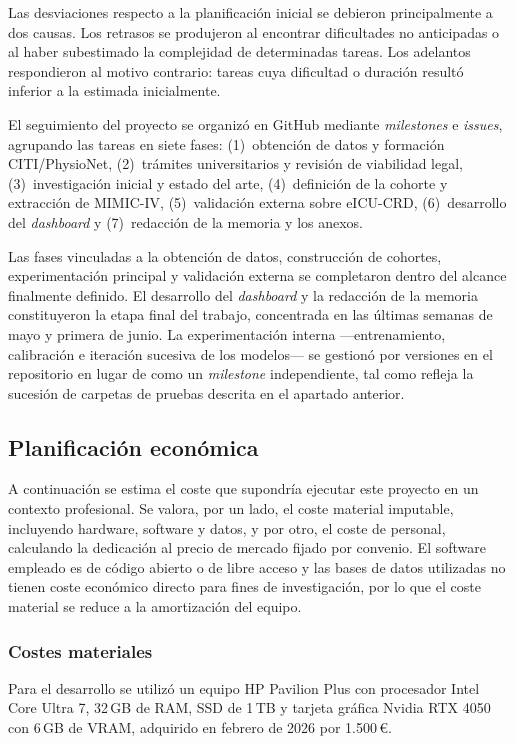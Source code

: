 \documentclass[
  spanish,
  a4paper,
  12pt,
  twoside]{memoir}
\begin{document}
Las desviaciones respecto a la planificación inicial se debieron principalmente a dos causas. Los retrasos se produjeron al encontrar dificultades no anticipadas o al haber subestimado la complejidad de determinadas tareas. Los adelantos respondieron al motivo contrario: tareas cuya dificultad o duración resultó inferior a la estimada inicialmente.

El seguimiento del proyecto se organizó en GitHub mediante \textit{milestones} e \textit{issues}, agrupando las tareas en siete fases: (1)~obtención de datos y formación CITI/PhysioNet, (2)~trámites universitarios y revisión de viabilidad legal, (3)~investigación inicial y estado del arte, (4)~definición de la cohorte y extracción de MIMIC-IV, (5)~validación externa sobre eICU-CRD, (6)~desarrollo del \textit{dashboard} y (7)~redacción de la memoria y los anexos.

Las fases vinculadas a la obtención de datos, construcción de cohortes, experimentación principal y validación externa se completaron dentro del alcance finalmente definido. El desarrollo del \textit{dashboard} y la redacción de la memoria constituyeron la etapa final del trabajo, concentrada en las últimas semanas de mayo y primera de junio. La experimentación interna —entrenamiento, calibración e iteración sucesiva de los modelos— se gestionó por versiones en el repositorio en lugar de como un \textit{milestone} independiente, tal como refleja la sucesión de carpetas de pruebas descrita en el apartado anterior.

\subsection{Planificación económica}

A continuación se estima el coste que supondría ejecutar este proyecto en un contexto profesional. Se valora, por un lado, el coste material imputable, incluyendo hardware, software y datos, y por otro, el coste de personal, calculando la dedicación al precio de mercado fijado por convenio. El software empleado es de código abierto o de libre acceso y las bases de datos utilizadas no tienen coste económico directo para fines de investigación, por lo que el coste material se reduce a la amortización del equipo.

\subsubsection*{Costes materiales}

Para el desarrollo se utilizó un equipo HP Pavilion Plus con procesador Intel Core Ultra 7, 32\,GB de RAM, SSD de 1\,TB y tarjeta gráfica Nvidia RTX 4050 con 6\,GB de VRAM, adquirido en febrero de 2026 por 1.500\,€.
\end{document}
